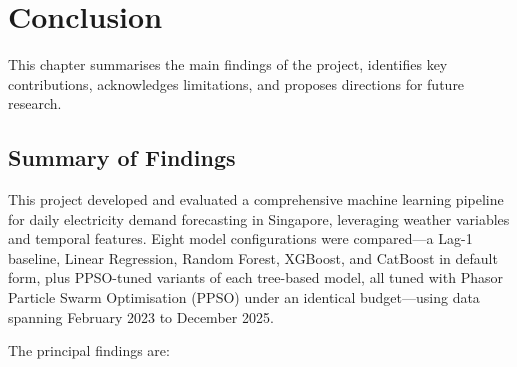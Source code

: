 \chapter{Conclusion}\label{ch:Conclusion}

This chapter summarises the main findings of the project, identifies key contributions, acknowledges limitations, and proposes directions for future research.


\section{Summary of Findings}

This project developed and evaluated a comprehensive machine learning pipeline for daily electricity demand forecasting in Singapore, leveraging weather variables and temporal features. Eight model configurations were compared---a Lag-1 baseline, Linear Regression, Random Forest, XGBoost, and CatBoost in default form, plus PPSO-tuned variants of each tree-based model, all tuned with Phasor Particle Swarm Optimisation (PPSO) under an identical budget---using data spanning February 2023 to December 2025.

The principal findings are:

